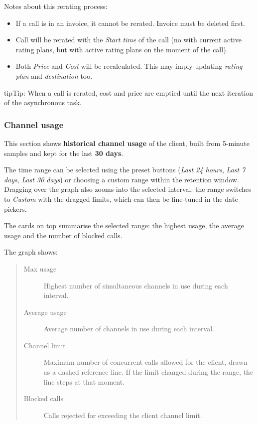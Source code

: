 \documentclass[letterpaper,10pt,english]{sphinxmanual}
\begin{document}
Notes about this rerating process:
\begin{itemize}
\item {} 
If a call is in an invoice, it cannot be rerated. Invoice must be deleted first.

\item {} 
Call will be rerated with the \emph{Start time} of the call (no with current active rating plans, but with active rating plans
on the moment of the call).

\item {} 
Both \emph{Price} and \emph{Cost} will be recalculated. This may imply updating \emph{rating plan} and \emph{destination} too.

\end{itemize}

\begin{notice}{tip}{Tip:}
When a call is rerated, cost and price are emptied until the next iteration of the asynchronous task.
\end{notice}


\subsubsection{Channel usage}
\label{administration_portal/client/retail/calls/channel_usage:channel-usage}\label{administration_portal/client/retail/calls/channel_usage::doc}
This section shows \textbf{historical channel usage} of the client, built from 5-minute samples and kept for the last
\textbf{30 days}.

The time range can be selected using the preset buttons (\emph{Last 24 hours}, \emph{Last 7 days}, \emph{Last 30 days}) or choosing
a custom range within the retention window. Dragging over the graph also zooms into the selected interval: the range
switches to \emph{Custom} with the dragged limits, which can then be fine-tuned in the date pickers.

The cards on top summarise the selected range: the highest usage, the average usage and the number of blocked calls.

The graph shows:
\begin{quote}
\begin{description}
\item[{Max usage}] \leavevmode
Highest number of simultaneous channels in use during each interval.

\item[{Average usage}] \leavevmode
Average number of channels in use during each interval.

\item[{Channel limit}] \leavevmode
Maximum number of concurrent calls allowed for the client, drawn as a dashed reference line. If the limit
changed during the range, the line steps at that moment.

\item[{Blocked calls}] \leavevmode
Calls rejected for exceeding the client channel limit.

\end{description}
\end{quote}
\end{document}
